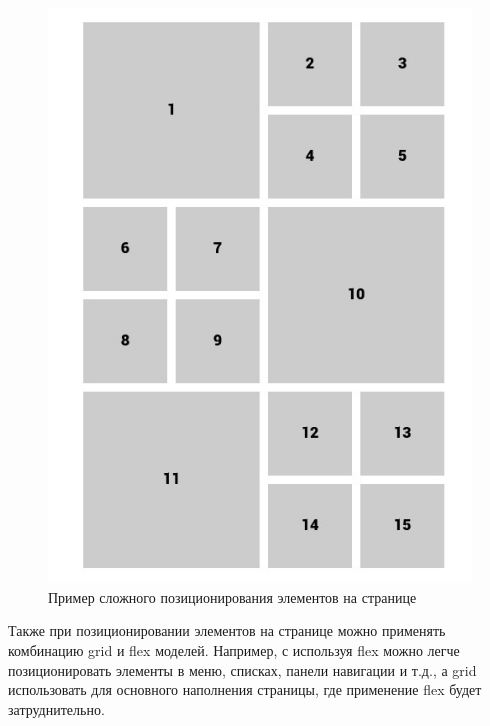 \begin{figure}[H]
  \centering
  \includegraphics[height=0.4\textheight]{assets/images/theoretical2/css-layout.jpg}
  \caption{Пример сложного позиционирования элементов на странице}
  \label{img:css__layout}
\end{figure}

Также при позиционировании элементов на странице можно применять комбинацию grid и flex моделей. Например, с используя flex можно легче позиционировать элементы в меню, списках, панели навигации и т.д., а grid использовать для основного наполнения страницы, где применение flex будет затруднительно.